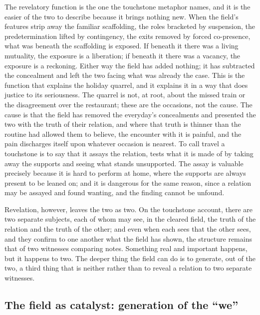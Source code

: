 The revelatory function is the one the touchstone metaphor names, and it is the easier of the two to describe because it brings nothing new. When the field's features strip away the familiar scaffolding, the roles bracketed by suspension, the predetermination lifted by contingency, the exits removed by forced co-presence, what was beneath the scaffolding is exposed. If beneath it there was a living mutuality, the exposure is a liberation; if beneath it there was a vacancy, the exposure is a reckoning. Either way the field has added nothing; it has subtracted the concealment and left the two facing what was already the case. This is the function that explains the holiday quarrel, and it explains it in a way that does justice to its seriousness. The quarrel is not, at root, about the missed train or the disagreement over the restaurant; these are the occasions, not the cause. The cause is that the field has removed the everyday's concealments and presented the two with the truth of their relation, and where that truth is thinner than the routine had allowed them to believe, the encounter with it is painful, and the pain discharges itself upon whatever occasion is nearest. To call travel a touchstone is to say that it assays the relation, tests what it is made of by taking away the supports and seeing what stands unsupported. The assay is valuable precisely because it is hard to perform at home, where the supports are always present to be leaned on; and it is dangerous for the same reason, since a relation may be assayed and found wanting, and the finding cannot be unfound.

Revelation, however, leaves the two as two. On the touchstone account, there are two separate subjects, each of whom may see, in the cleared field, the truth of the relation and the truth of the other; and even when each sees that the other sees, and they confirm to one another what the field has shown, the structure remains that of two witnesses comparing notes. Something real and important happens, but it happens to two. The deeper thing the field can do is to generate, out of the two, a third thing that is neither rather than to reveal a relation to two separate witnesses.

\subsection{The field as catalyst: generation of the ``we''}
\label{p21:sub:sp-generation}

